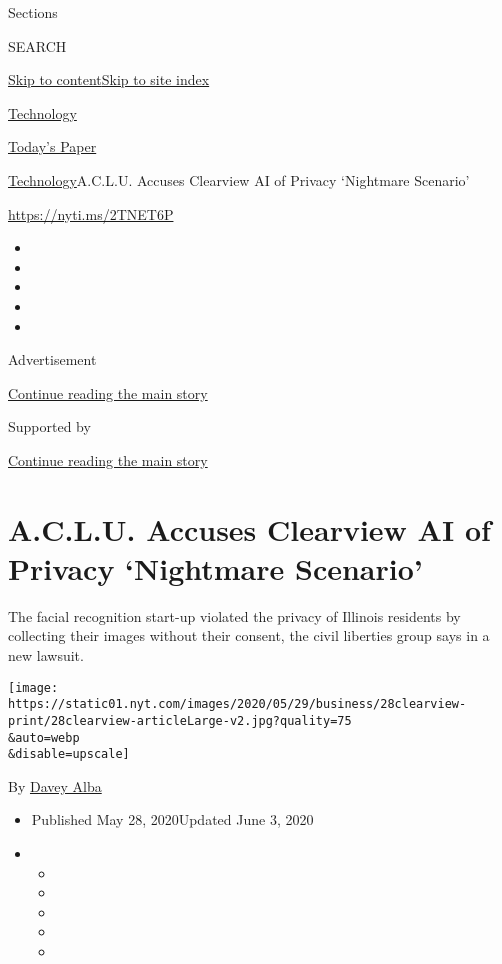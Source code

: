 Sections

SEARCH

\protect\hyperlink{site-content}{Skip to
content}\protect\hyperlink{site-index}{Skip to site index}

\href{https://www.nytimes.com/section/technology}{Technology}

\href{https://myaccount.nytimes.com/auth/login?response_type=cookie\&client_id=vi}{}

\href{https://www.nytimes.com/section/todayspaper}{Today's Paper}

\href{/section/technology}{Technology}\textbar{}A.C.L.U. Accuses
Clearview AI of Privacy `Nightmare Scenario'

\url{https://nyti.ms/2TNET6P}

\begin{itemize}
\item
\item
\item
\item
\item
\end{itemize}

Advertisement

\protect\hyperlink{after-top}{Continue reading the main story}

Supported by

\protect\hyperlink{after-sponsor}{Continue reading the main story}

\hypertarget{aclu-accuses-clearview-ai-of-privacy-nightmare-scenario}{%
\section{A.C.L.U. Accuses Clearview AI of Privacy `Nightmare
Scenario'}\label{aclu-accuses-clearview-ai-of-privacy-nightmare-scenario}}

The facial recognition start-up violated the privacy of Illinois
residents by collecting their images without their consent, the civil
liberties group says in a new lawsuit.

\texttt{[image: https://static01.nyt.com/images/2020/05/29/business/28clearview-print/28clearview-articleLarge-v2.jpg?quality=75\\\&auto=webp\\\&disable=upscale]}

By \href{https://www.nytimes.com/by/davey-alba}{Davey Alba}

\begin{itemize}
\item
  Published May 28, 2020Updated June 3, 2020
\item
  \begin{itemize}
  \item
  \item
  \item
  \item
  \item
  \end{itemize}
\end{itemize}


